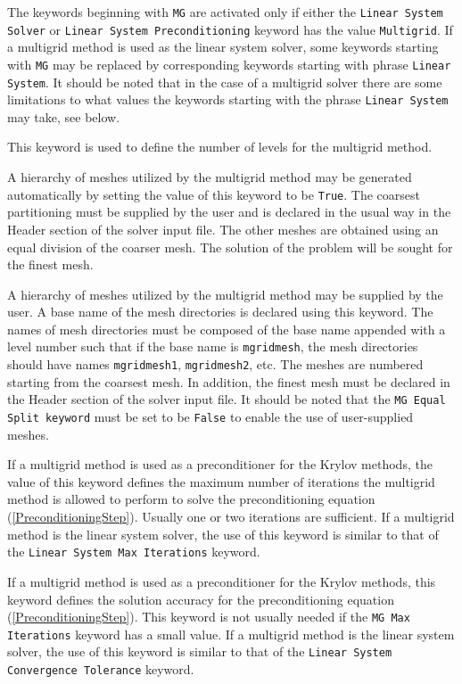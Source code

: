 \sifend


The keywords beginning with {\tt MG} are activated only if either 
the {\tt Linear System Solver} or {\tt Linear System Preconditioning} keyword has 
the value {\tt Multigrid}. If a multigrid method is used as the linear system solver,
some keywords starting with {\tt MG} may be replaced by 
corresponding keywords starting with phrase {\tt Linear System}.
It should be noted that in the case of a multigrid solver there are some limitations to
what values the keywords starting with the phrase {\tt Linear System} may take,
see below.


\sifbegin
{}
This keyword is used to define the number of levels for the multigrid method.

A hierarchy of meshes utilized by the multigrid method may be generated automatically 
by setting the value of this keyword to be {\tt True}. The coarsest partitioning must 
be supplied by the user and is declared in the usual way in the Header section of
the solver input file. The other meshes are obtained using an equal division of 
the coarser mesh. The solution of the problem will be sought for the finest mesh.

A hierarchy of meshes utilized by the multigrid method may be supplied by the user.
A base name of the mesh directories is declared using this keyword.
The names of mesh directories must be composed of the base name appended with a level number
such that if the base name is {\tt mgridmesh}, the mesh directories should have names 
{\tt mgridmesh1}, {\tt mgridmesh2}, etc. The meshes are numbered starting from 
the coarsest mesh. In addition, the finest mesh must be 
declared in the Header section of the solver input file. It should be noted that
the {\tt MG Equal Split keyword} must be set to be {\tt False} to enable the use of 
user-supplied meshes. 

If a multigrid method is used as a preconditioner for the Krylov methods, the value of 
this keyword defines the maximum number of iterations the multigrid method is 
allowed to perform to solve the preconditioning equation (\ref{PreconditioningStep}). 
Usually one or two iterations are sufficient.
If a multigrid method is the linear system solver, the use of this keyword is 
similar to that of the {\tt Linear System Max Iterations} keyword.

If a multigrid method is used as a preconditioner for the Krylov methods, 
this keyword defines the solution accuracy for the
preconditioning equation (\ref{PreconditioningStep}). 
This keyword is not usually needed if the {\tt MG Max Iterations} 
keyword has a small value. If a multigrid method is the linear system solver, 
the use of this keyword is similar to that of 
the {\tt Linear System Convergence Tolerance} keyword.


